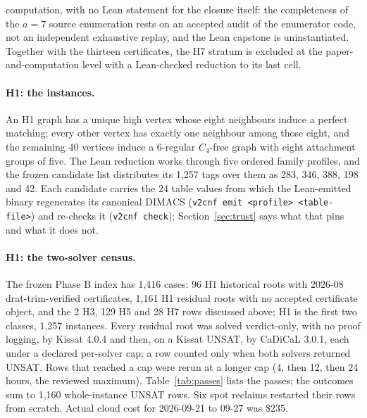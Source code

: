 \documentclass{anvil-paper}
\theoremstyle{definition}
\begin{document}
computation, with no Lean statement for the closure itself: the completeness of the $a=7$ source enumeration rests on an accepted audit of the enumerator code, not an independent exhaustive replay, and the Lean capstone is uninstantiated. Together with the thirteen certificates, the H7 stratum is excluded at the paper-and-computation level with a Lean-checked reduction to its last cell.

\paragraph{H1: the instances.} An H1 graph has a unique high vertex whose eight neighbours induce a perfect matching; every other vertex has exactly one neighbour among those eight, and the remaining 40 vertices induce a 6-regular $C_4$-free graph with eight attachment groups of five. The Lean reduction  works through five ordered family profiles, and the frozen candidate list distributes its 1,257 tags over them as 283, 346, 388, 198 and 42. Each candidate carries the 24 table values from which the Lean-emitted binary regenerates its canonical DIMACS (\texttt{v2cnf emit <profile> <table-file>}) and re-checks it (\texttt{v2cnf check}); Section~\ref{sec:trust} says what that pins and what it does not.

\paragraph{H1: the two-solver census.} The frozen Phase B index has 1,416 cases: 96 H1 historical roots with 2026-08 drat-trim-verified certificates, 1,161 H1 residual roots with no accepted certificate object, and the 2 H3, 129 H5 and 28 H7 rows discussed above; H1 is the first two classes, 1,257 instances. Every residual root was solved verdict-only, with no proof logging, by Kissat 4.0.4 and then, on a Kissat UNSAT, by CaDiCaL 3.0.1, each under a declared per-solver cap; a row counted only when both solvers returned UNSAT. Rows that reached a cap were rerun at a longer cap (4, then 12, then 24 hours, the reviewed maximum). Table~\ref{tab:passes} lists the passes; the outcomes sum to 1,160 whole-instance UNSAT rows. Six spot reclaims restarted their rows from scratch. Actual cloud cost for 2026-09-21 to 09-27 was \$235.
\end{document}
